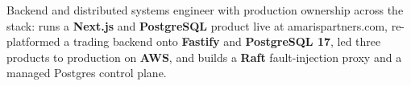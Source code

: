Backend and distributed systems engineer with production ownership across the stack: runs a \textbf{Next.js} and \textbf{PostgreSQL} product live at amarispartners.com, re-platformed a trading backend onto \textbf{Fastify} and \textbf{PostgreSQL 17}, led three products to production on \textbf{AWS}, and builds a \textbf{Raft} fault-injection proxy and a managed Postgres control plane.
